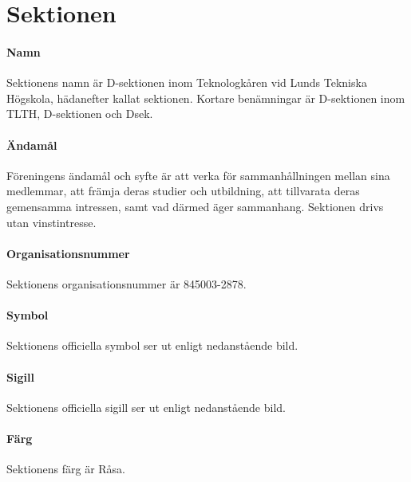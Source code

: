 \documentclass{dsekstatutes}
\begin{document}
\maketitle

\section{Sektionen}
\paragraph{Namn}                %
Sektionens namn är D-sektionen inom Teknologkåren vid Lunds Tekniska Högskola,
hädanefter kallat sektionen. Kortare benämningar är D-sektionen inom TLTH,
D-sektionen och Dsek.

\paragraph{Ändamål}
\label{ändamål}
Föreningens ändamål och syfte är att verka för sammanhållningen mellan sina
medlemmar, att främja deras studier och utbildning, att tillvarata deras
gemensamma intressen, samt vad därmed äger sammanhang. Sektionen drivs utan
vinstintresse.

\paragraph{Organisationsnummer}
Sektionens organisationsnummer är 845003-2878.

\paragraph{Symbol}
Sektionens officiella symbol ser ut enligt nedanstående bild.

\Dsymbol[height=10mm]

\paragraph{Sigill}
Sektionens officiella sigill ser ut enligt nedanstående bild.

\Dseksigil[height=30mm, color]

\paragraph{Färg}
Sektionens färg är Råsa.
\end{document}
